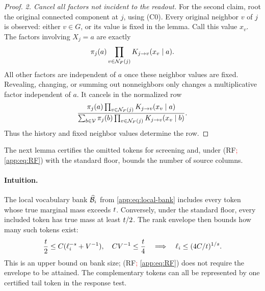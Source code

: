 \begin{proof}
\emph{2. Cancel all factors not incident to the readout.}
For the second claim, root the original connected component at $j$,
using (C0).
Every original neighbor $v$ of $j$ is observed: either $v\in G$, or its
value is fixed in the lemma.  Call this value $x_v$.  The factors involving
$X_j=a$ are exactly
\[
 \pi_{j}(a)
 \prod_{v\in\mathcal N_{F}(j)}
       K_{j\to v}(x_v\mid a).
\]
All other factors are independent of $a$ once these neighbor values are
fixed.  Revealing, changing, or summing out nonneighbors only changes a
multiplicative factor independent of $a$.  It cancels in the normalized row
\[
 \frac{\pi_{j}(a)
       \prod_{v\in\mathcal N_{F}(j)}
          K_{j\to v}(x_v\mid a)}
      {\sum_{b\in\mathcal V}\pi_{j}(b)
       \prod_{v\in\mathcal N_{F}(j)}
          K_{j\to v}(x_v\mid b)}.
\]
Thus the history and fixed neighbor values determine the row.
\end{proof}

The next lemma certifies the omitted tokens for screening and, under (RF\textcolor{red}{; \cref{app:eq:RF}})
with the standard floor, bounds the number of source columns.

\paragraph{Intuition.}
The local vocabulary bank $\widehat{\mathcal B}_{i}$ from \eqref{app:eq:local-bank}
includes every token whose true marginal mass exceeds $t$.  Conversely, under the standard floor, every included
token has true mass at least $t/2$.
The rank envelope then bounds how many such tokens exist:
\[
 \frac{t}{2}
 \le C(\ell_{i}^{-s}+V^{-1}),
 \quad
 CV^{-1}\le\frac{t}{4}
 \quad\Longrightarrow\quad
 \ell_{i}\le(4C/t)^{1/s}.
\]
This is an upper bound on bank size; (RF\textcolor{red}{; \cref{app:eq:RF}}) does not require the envelope to
be attained.  The complementary tokens can all be represented by one
certified tail token in the response test.

